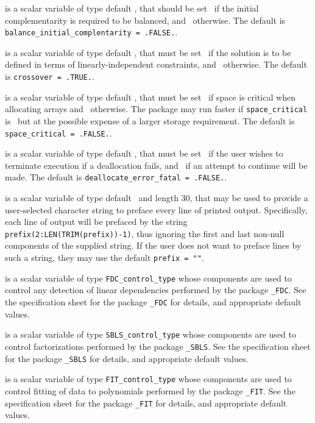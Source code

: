 \begin{description}
 is a scalar variable of type 
default \logical, that should be set \true\
if the initial complementarity is required to be balanced,
and \false\ otherwise.
The default is {\tt balance\_initial\_complentarity = .FALSE.}.

 is a scalar variable of type default \logical,
that must be set \true\ if the solution is to be defined in terms
of linearly-independent constraints,
and  \false\ otherwise.
The default is {\tt crossover = .TRUE.}.

 is a scalar variable of type default \logical,
that must be set \true\ if space is critical when allocating arrays
and  \false\ otherwise. The package may run faster if
{\tt space\_critical} is \false\ but at the possible expense of a larger
storage requirement. The default is {\tt space\_critical = .FALSE.}.

 is a scalar variable of type default \logical,
that must be set \true\ if the user wishes to terminate execution if
a deallocation  fails, and \false\ if an attempt to continue
will be made. The default is {\tt deallocate\_error\_fatal = .FALSE.}.

 is a scalar variable of type default \character\
and length 30, that may be used to provide a user-selected
character string to preface every line of printed output.
Specifically, each line of output will be prefaced by the string
{\tt prefix(2:LEN(TRIM(prefix))-1)},
thus ignoring the first and last non-null components of the
supplied string. If the user does not want to preface lines by such
a string, they may use the default {\tt prefix = ""}.

 is a scalar variable of type
{\tt FDC\_control\_type}
whose components are used to control any detection of linear dependencies
performed by the package
{\tt \libraryname\_FDC}.
See the specification sheet for the package
{\tt \libraryname\_FDC}
for details, and appropriate default values.

 is a scalar variable of type
{\tt SBLS\_control\_type}
whose components are used to control factorizations
performed by the package
{\tt \libraryname\_SBLS}.
See the specification sheet for the package
{\tt \libraryname\_SBLS}
for details, and appropriate default values.

 is a scalar variable of type
{\tt FIT\_control\_type}
whose components are used to control fitting of data to polynomials
performed by the package
{\tt \libraryname\_FIT}.
See the specification sheet for the package
{\tt \libraryname\_FIT}
for details, and appropriate default values.


\end{description}
